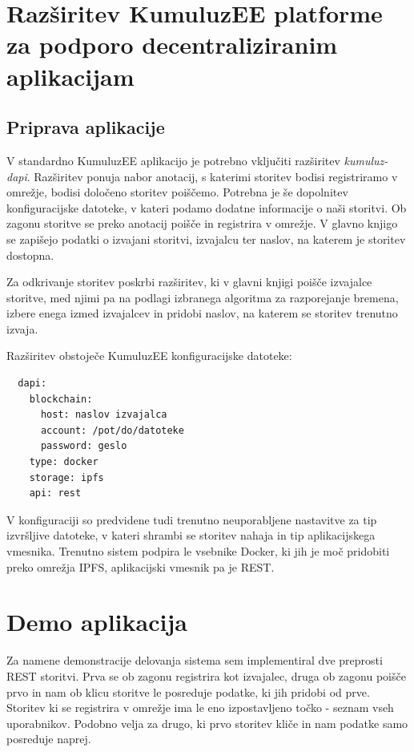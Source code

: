 \documentclass[a4paper, 12pt]{book}
\begin{document}
\section{Razširitev KumuluzEE platforme za podporo decentraliziranim aplikacijam}

\subsection{Priprava aplikacije}
V standardno KumuluzEE aplikacijo je potrebno vključiti razširitev \textit{kumuluz-dapi}. 
Razširitev ponuja nabor anotacij, s katerimi storitev bodisi registriramo v omrežje, bodisi določeno storitev poiščemo.
Potrebna je še dopolnitev konfiguracijske datoteke, v kateri podamo dodatne informacije o naši storitvi.
Ob zagonu storitve se preko anotacij poišče in registrira v omrežje.
V glavno knjigo se zapišejo podatki o izvajani storitvi, izvajalcu ter naslov, na katerem je storitev dostopna.

Za odkrivanje storitev poskrbi razširitev, ki v glavni knjigi poišče izvajalce storitve, med njimi pa na podlagi izbranega algoritma za razporejanje bremena, izbere enega izmed izvajalcev in pridobi naslov, na katerem se storitev trenutno izvaja.

Razširitev obstoječe KumuluzEE konfiguracijske datoteke:
\begin{lstlisting}
  dapi:
    blockchain:
      host: naslov izvajalca
      account: /pot/do/datoteke
      password: geslo
    type: docker
    storage: ipfs
    api: rest
\end{lstlisting}

V konfiguraciji so predvidene tudi trenutno neuporabljene nastavitve za tip izvršljive datoteke, v kateri shrambi se storitev nahaja in tip aplikacijskega vmesnika.
Trenutno sistem podpira le vsebnike Docker, ki jih je moč pridobiti preko omrežja IPFS, aplikacijski vmesnik pa je REST.


\section{Demo aplikacija}

Za namene demonstracije delovanja sistema sem implementiral dve preprosti REST storitvi.
Prva se ob zagonu registrira kot izvajalec, druga ob zagonu poišče prvo in nam ob klicu storitve le posreduje podatke, ki jih pridobi od prve.
Storitev ki se registrira v omrežje ima le eno izpostavljeno točko - seznam vseh uporabnikov.
Podobno velja za drugo, ki prvo storitev kliče in nam podatke samo posreduje naprej.
\end{document}
